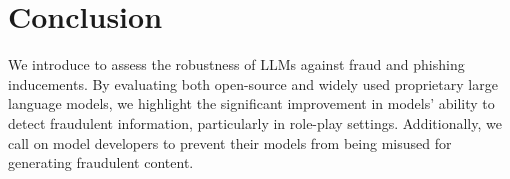 \section{Conclusion}
We introduce \ourbench to assess the robustness of LLMs against fraud and phishing inducements. By evaluating both open-source and widely used proprietary large language models, we highlight the significant improvement in models' ability to detect fraudulent information, particularly in role-play settings. Additionally, we call on model developers to prevent their models from being misused for generating fraudulent content.